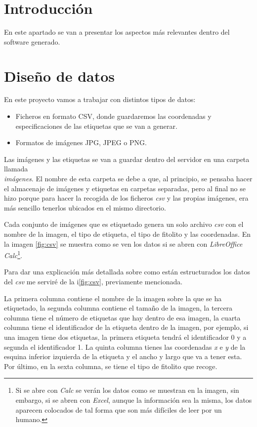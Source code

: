 
\section{Introducción}
En este apartado se van a presentar los aspectos más relevantes dentro del software generado.

\section{Diseño de datos}
En este proyecto vamos a trabajar con distintos tipos de datos:
\begin{itemize}
	\item Ficheros en formato CSV, donde guardaremos las coordenadas y especificaciones de las etiquetas que se van a generar.
	\item Formatos de imágenes JPG, JPEG o PNG.
\end{itemize}

Las imágenes y las etiquetas se van a guardar dentro del servidor en una carpeta llamada \textit{\\imágenes}. El nombre de esta carpeta se debe a que, al principio, se pensaba hacer el almacenaje de imágenes y etiquetas en carpetas separadas, pero al final no se hizo porque para hacer la recogida de los ficheros \textit{csv} y las propias imágenes, era más sencillo tenerlos ubicados en el mismo directorio.

Cada conjunto de imágenes que es etiquetado genera un solo archivo \textit{csv} con el nombre de la imagen, el tipo de etiqueta, el tipo de fitolito y las coordenadas. En la imagen \ref{fig:csv} se muestra como se ven los datos si se abren con \textit{LibreOffice Calc}\footnote{Si se abre con \textit{Calc} se verán los datos como se muestran en la imagen, sin embargo, si se abren con \textit{Excel}, aunque la información sea la misma, los datos aparecen colocados de tal forma que son más difíciles de leer por un humano.}.

Para dar una explicación más detallada sobre como están estructurados los datos del \textit{csv} me serviré de la i\ref{fig:csv}, previamente mencionada.

La primera columna contiene el nombre de la imagen sobre la que se ha etiquetado, la segunda columna contiene el tamaño de la imagen, la tercera columna tiene el número de etiquetas que hay dentro de esa imagen, la cuarta columna tiene el identificador de la etiqueta dentro de la imagen, por ejemplo, si una imagen tiene dos etiquetas, la primera etiqueta tendrá el identificador 0 y a segunda el identificador 1. La quinta columna tienes las coordenadas \textit{x} e \textit{y} de la esquina inferior izquierda de la etiqueta y el ancho y largo que va a tener esta. Por último, en la sexta columna, se tiene el tipo de fitolito que recoge.
